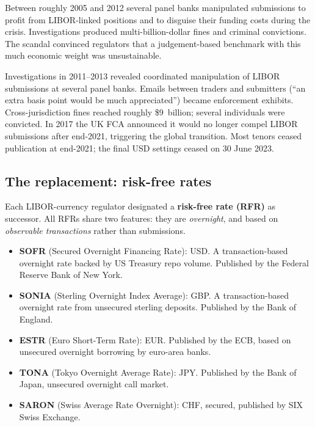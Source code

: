Between roughly 2005 and 2012 several panel banks manipulated
submissions to profit from LIBOR-linked positions and to disguise
their funding costs during the crisis.  Investigations produced
multi-billion-dollar fines and criminal convictions.  The scandal
convinced regulators that a judgement-based benchmark with this
much economic weight was unsustainable.

\begin{historybox}[title={LIBOR scandal 2012}]
Investigations in 2011--2013 revealed coordinated manipulation
of LIBOR submissions at several panel banks.  Emails between
traders and submitters (``an extra basis point would be much
appreciated'') became enforcement exhibits.  Cross-jurisdiction
fines reached roughly \$9~billion; several individuals were
convicted.  In 2017 the UK FCA announced it would no longer
compel LIBOR submissions after end-2021, triggering the global
transition.  Most tenors ceased publication at end-2021; the
final USD settings ceased on 30 June 2023.
\end{historybox}

\subsection{The replacement: risk-free rates}

Each LIBOR-currency regulator designated a \textbf{risk-free
rate (RFR)} as successor.  All RFRs share two features: they are
\emph{overnight}, and based on \emph{observable transactions}
rather than submissions.

\begin{itemize}
  \item \textbf{SOFR} (Secured Overnight Financing Rate):
    USD.  A transaction-based overnight rate backed by US
    Treasury repo volume.  Published by the Federal Reserve
    Bank of New York.
  \item \textbf{SONIA} (Sterling Overnight Index Average):
    GBP.  A transaction-based overnight rate from unsecured
    sterling deposits.  Published by the Bank of England.
  \item \textbf{ESTR} (Euro Short-Term Rate):
    EUR.  Published by the ECB, based on unsecured overnight
    borrowing by euro-area banks.
  \item \textbf{TONA} (Tokyo Overnight Average Rate): JPY.
    Published by the Bank of Japan, unsecured overnight call
    market.
  \item \textbf{SARON} (Swiss Average Rate Overnight):
    CHF, secured, published by SIX Swiss Exchange.
\end{itemize}

